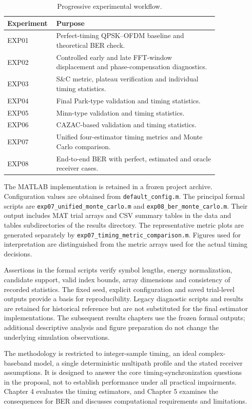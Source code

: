 \begin{table}[htbp]
\centering
\caption{Progressive experimental workflow.}
\label{tab:method_workflow}
\small
\begin{tabular}{p{0.14\linewidth}p{0.72\linewidth}}
\hline
Experiment & Purpose\\ \hline
EXP01 & Perfect-timing QPSK--OFDM baseline and theoretical BER check.\\
EXP02 & Controlled early and late FFT-window displacement and phase-compensation diagnostics.\\
EXP03 & S\&C metric, plateau verification and individual timing statistics.\\
EXP04 & Final Park-type validation and timing statistics.\\
EXP05 & Minn-type validation and timing statistics.\\
EXP06 & CAZAC-based validation and timing statistics.\\
EXP07 & Unified four-estimator timing metrics and Monte Carlo comparison.\\
EXP08 & End-to-end BER with perfect, estimated and oracle receiver cases.\\ \hline
\end{tabular}
\end{table}

The MATLAB implementation is retained in a frozen project archive. Configuration values are obtained from \texttt{default\_config.m}. The principal formal scripts are \texttt{exp07\_unified\_monte\_carlo.m} and \texttt{exp08\_ber\_monte\_carlo.m}. Their output includes MAT trial arrays and CSV summary tables in the data and tables subdirectories of the results directory. The representative metric plots are generated separately by \texttt{exp07\_timing\_metric\_comparison.m}. Figures used for interpretation are distinguished from the metric arrays used for the actual timing decisions.

Assertions in the formal scripts verify symbol lengths, energy normalization, candidate support, valid index bounds, array dimensions and consistency of recorded statistics. The fixed seed, explicit configuration and saved trial-level outputs provide a basis for reproducibility. Legacy diagnostic scripts and results are retained for historical reference but are not substituted for the final estimator implementations. The subsequent results chapters use the frozen formal outputs; additional descriptive analysis and figure preparation do not change the underlying simulation observations.

The methodology is restricted to integer-sample timing, an ideal complex-baseband model, a single deterministic multipath profile and the stated receiver assumptions. It is designed to answer the core timing-synchronization questions in the proposal, not to establish performance under all practical impairments. Chapter 4 evaluates the timing estimators, and Chapter 5 examines the consequences for BER and discusses computational requirements and limitations.
